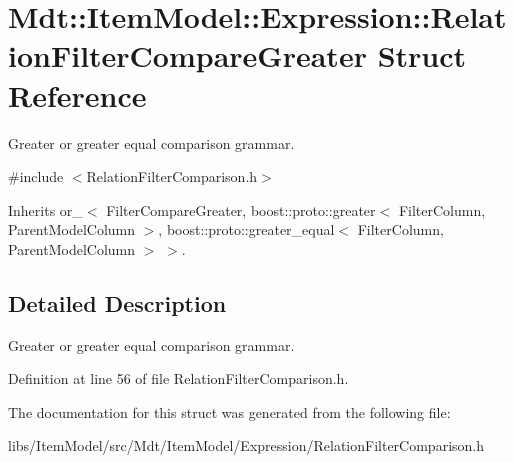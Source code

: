 \hypertarget{struct_mdt_1_1_item_model_1_1_expression_1_1_relation_filter_compare_greater}{}\section{Mdt\+:\+:Item\+Model\+:\+:Expression\+:\+:Relation\+Filter\+Compare\+Greater Struct Reference}
\label{struct_mdt_1_1_item_model_1_1_expression_1_1_relation_filter_compare_greater}


Greater or greater equal comparison grammar.  




{\ttfamily \#include $<$Relation\+Filter\+Comparison.\+h$>$}



Inherits or\+\_\+$<$ Filter\+Compare\+Greater, boost\+::proto\+::greater$<$ Filter\+Column, Parent\+Model\+Column $>$, boost\+::proto\+::greater\+\_\+equal$<$ Filter\+Column, Parent\+Model\+Column $>$ $>$.



\subsection{Detailed Description}
Greater or greater equal comparison grammar. 

Definition at line 56 of file Relation\+Filter\+Comparison.\+h.



The documentation for this struct was generated from the following file\+:\begin{DoxyCompactItemize}
\item 
libs/\+Item\+Model/src/\+Mdt/\+Item\+Model/\+Expression/Relation\+Filter\+Comparison.\+h\end{DoxyCompactItemize}

